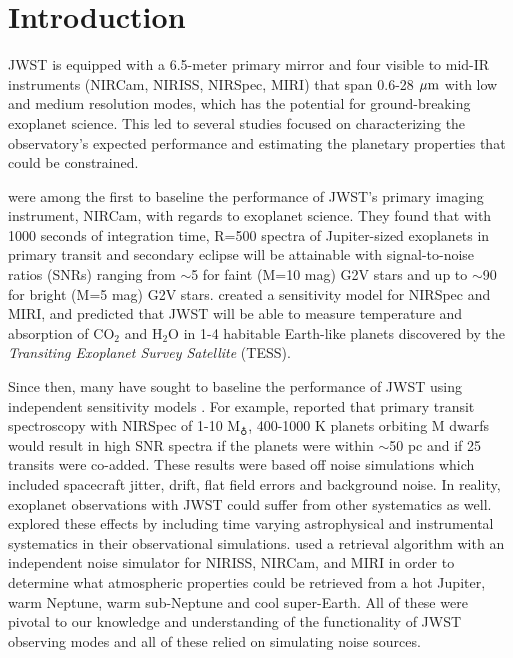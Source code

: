 \documentclass[iop]{emulateapj}
\begin{document}
\keywords{}

\section{Introduction}

JWST is equipped with a 6.5-meter primary mirror
and four visible to mid-IR 
instruments  
(NIRCam, NIRISS, NIRSpec, MIRI) that span 0.6-28
$\mbox{$\mu$m}$ with low and medium resolution modes, which has the potential for ground-breaking
exoplanet science. This led to several studies focused on characterizing the observatory's expected performance
and estimating the planetary properties that could be constrained. 

\citet{gre07} were among the first to baseline the performance of JWST's primary imaging instrument, NIRCam, with regards to exoplanet science. They found that with
1000 seconds of integration time, R=500 spectra of Jupiter-sized exoplanets in primary
transit and secondary eclipse will be attainable with signal-to-noise ratios (SNRs) ranging
from $\sim$5 for faint (M=10 mag) G2V stars and up to $\sim$90 for bright (M=5 mag)
G2V stars.  \citet{dem09} created a sensitivity model for NIRSpec and MIRI, and predicted
that JWST will be able to measure temperature and absorption of CO$_2$ and
H$_2$O in 1-4 habitable Earth-like planets discovered by the \emph{Transiting
Exoplanet Survey Satellite} (TESS). 

Since then, many have sought to baseline the performance of JWST using independent sensitivity models \citep{kal09,bei14,bat15, cow15,bar15, bar16, gre16, mor16,mol16,how17,bat17}. For example, \citet{bat15} reported that primary transit spectroscopy with
NIRSpec of 1-10 M$_\earth$, 400-1000 K planets orbiting M dwarfs would
result in high SNR spectra if the planets were within $\sim$50 pc and if 25
transits were co-added. These results were based off noise simulations which
included spacecraft jitter, drift, flat field errors and background noise. In
reality, exoplanet observations with JWST could suffer from other systematics
as well. \citet{bar15} explored these effects by including time varying
astrophysical and instrumental systematics in their observational simulations. \citet{gre16} used
a retrieval algorithm with an independent noise simulator for NIRISS,
NIRCam, and MIRI in order to determine what atmospheric properties could be
retrieved from a hot Jupiter, warm Neptune, warm sub-Neptune and cool
super-Earth. All of these were pivotal to our knowledge and understanding of the functionality of JWST observing modes and all of these relied on simulating noise sources. 
\end{document}
